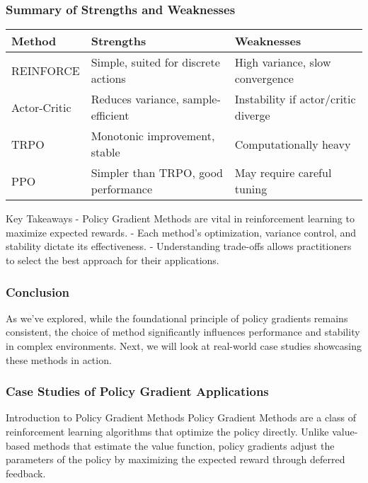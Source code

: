 \documentclass{beamer}
\begin{document}
\begin{frame}[fragile]
    \frametitle{Summary of Strengths and Weaknesses}
    \begin{table}[ht]
        \centering
        \begin{tabular}{|l|l|l|}
            \hline
            \textbf{Method} & \textbf{Strengths} & \textbf{Weaknesses} \\ 
            \hline
            REINFORCE & Simple, suited for discrete actions & High variance, slow convergence \\ 
            \hline
            Actor-Critic & Reduces variance, sample-efficient & Instability if actor/critic diverge \\ 
            \hline
            TRPO & Monotonic improvement, stable & Computationally heavy \\ 
            \hline
            PPO & Simpler than TRPO, good performance & May require careful tuning \\ 
            \hline
        \end{tabular}
    \end{table}

    \begin{block}{Key Takeaways}
        - Policy Gradient Methods are vital in reinforcement learning to maximize expected rewards.
        - Each method's optimization, variance control, and stability dictate its effectiveness.
        - Understanding trade-offs allows practitioners to select the best approach for their applications.
    \end{block}
\end{frame}

\begin{frame}[fragile]
    \frametitle{Conclusion}
    As we've explored, while the foundational principle of policy gradients remains consistent, the choice of method significantly influences performance and stability in complex environments. Next, we will look at real-world case studies showcasing these methods in action.
\end{frame}

\begin{frame}[fragile]
    \frametitle{Case Studies of Policy Gradient Applications}
    \begin{block}{Introduction to Policy Gradient Methods}
        Policy Gradient Methods are a class of reinforcement learning algorithms that optimize the policy directly. Unlike value-based methods that estimate the value function, policy gradients adjust the parameters of the policy by maximizing the expected reward through deferred feedback.
    \end{block}
\end{frame}
\end{document}
